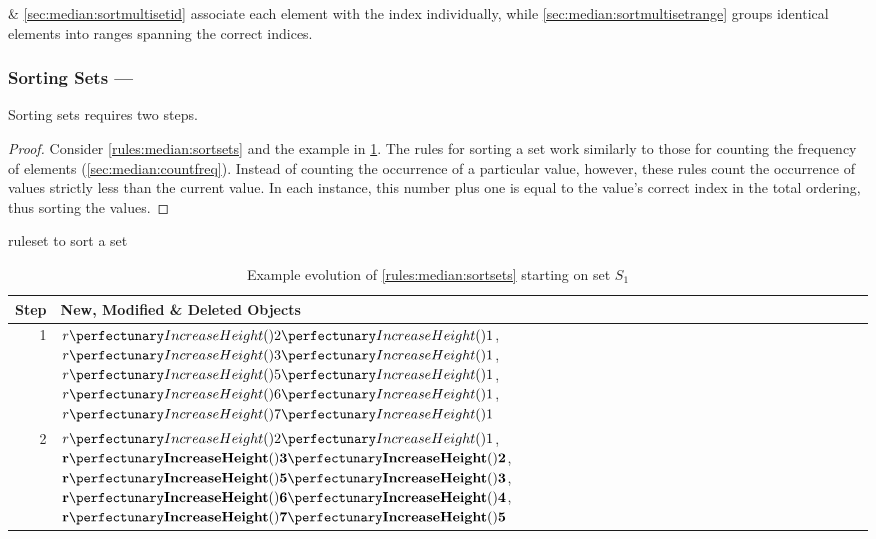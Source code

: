  \& \cref{sec:median:sortmultisetid} associate each element with the index individually, while \cref{sec:median:sortmultisetrange} groups identical elements into ranges spanning the correct indices.

\subsubsection{Sorting Sets --- }  \label{sec:median:sortsets}

\begin{proposition}\label{prop:median:sortsets}
Sorting sets requires two steps.
\end{proposition}

\begin{proof}
Consider \cref{rules:median:sortsets} and the example in \cref{tab:median:sortsets}.  The rules for sorting a set work similarly to those for counting the frequency of elements (\cref{sec:median:countfreq}).  Instead of counting the occurrence of a particular value, however, these rules count the occurrence of values strictly less than the current value.  In each instance, this number plus one is equal to the value's correct index in the total ordering, thus sorting the values.
\end{proof}

\begin{cprulesetfloat}
\begin{cpruleset}

\end{cpruleset}
\caption{\label{rules:median:sortsets}\Gls{ruleset} to sort a set}
\end{cprulesetfloat}

\begin{table}[htbp]
\centering
   \begin{tabular}{|r|l|}
    \hline
    \textbf{Step} & \textbf{New, Modified \& Deleted Objects} \\ \hline
    1 & \(\cpfuncn{r}{2}{1}\), \(\cpfuncn{r}{3}{1}\), \(\cpfuncn{r}{5}{1}\), \(\cpfuncn{r}{6}{1}\), \(\cpfuncn{r}{7}{1}\)\\ \hline
    2 & \(\cpfuncn{r}{2}{1}\), \(\mathbf{\cpfuncn{r}{3}{2}}\), \(\mathbf{\cpfuncn{r}{5}{3}}\), \(\mathbf{\cpfuncn{r}{6}{4}}\), \(\mathbf{\cpfuncn{r}{7}{5}}\)\\ \hline

\end{tabular}
\caption[Example evolution of \cref{rules:median:sortsets} to sort a set]{\label{tab:median:sortsets}Example evolution of \cref{rules:median:sortsets} starting on set \(S_1\)}
\end{table}

